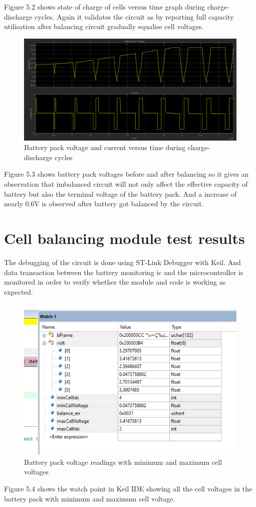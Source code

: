 Figure 5.2 shows state of charge of cells versus time graph during charge-discharge cycles. Again it validates the circuit as by reporting full capacity utilisation after balancing circuit gradually equalise cell voltages.

\begin{figure}[h!]
    \centering
    \includegraphics[scale = 0.5]{Chapter5/Figures/batterypackvoltage.png}
    \caption{Battery pack voltage and current versus time during charge-discharge cycles}
\end{figure}
\vspace{0.5cm}
Figure 5.3 shows battery pack voltages before and after balancing so it gives an observation that imbalanced circuit will not only affect the effective capacity of battery but also the terminal voltage of the battery pack. And a increase of nearly 0.6V is observed after battery got balanced by the circuit.

\pagebreak

\section{Cell balancing module test results} 
The debugging of the circuit is done using ST-Link Debugger with Keil. And data transaction between the battery monitoring \acrshort{ic} and the microcontroller is monitored in order to verify whether the module and code is working as expected. 

\begin{figure}[H]
    \centering
    \includegraphics[scale = 0.7]{Chapter5/Figures/Screenshot (68).png}
    \caption{Battery pack voltage readings with minimum and maximum cell voltages}
\end{figure} 

Figure 5.4 shows the watch point in Keil IDE showing all the cell voltages in the battery pack with minimum and maximum cell voltage. 

